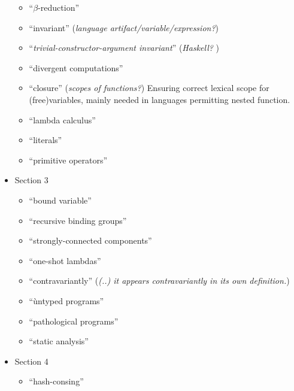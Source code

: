 \begin{itemize}
\begin{itemize}
	\item ``\textit{$\beta$}-reduction''
	\item ``invariant'' (\textit{language artifact/variable/expression?})
	\item ``\textit{trivial-constructor-argument invariant}'' (\textit{Haskell?
})
	\item ``divergent computations''

	\item ``closure'' (\textit{scopes of functions?})
Ensuring correct lexical scope for (free)variables, mainly needed in languages
permitting nested function.

	\item ``lambda calculus''
	\item ``literals''
	\item ``primitive operators''

\end{itemize}

	\item Section 3
\begin{itemize}

	\item ``bound variable''
	\item ``recursive binding groups''
	\item ``strongly-connected components''
	\item ``one-shot lambdas''
	\item ``contravariantly''
	(\textit{(..) it appears contravariantly in its own definition.})
	\item ``ùntyped programs''
	\item ``pathological programs''
	\item ``static analysis''

\end{itemize}

	\item Section 4
\begin{itemize}

	\item ``hash-consing''

\end{itemize}

\end{itemize}
